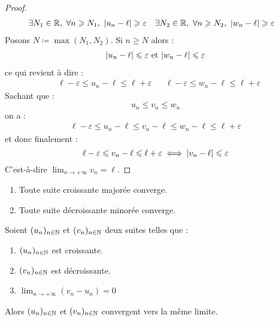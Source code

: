 \begin{proof}
    \begin{align*}
        &\exists N_1 \in \mathbb{R},\ \forall n \geqslant N_1,\ \abs{u_n - \ell} \geqslant \varepsilon &
        &\exists N_2 \in \mathbb{R},\ \forall n \geqslant N_2,\ \abs{w_n - \ell} \geqslant \varepsilon
    \end{align*}
    Posons $N \coloneqq \max(N_1, N_2)$. Si $n \geq N$ alors :
    \begin{align*}
        \abs{u_n - \ell} \leqslant \varepsilon \text{ et } \abs{w_n - \ell} \leqslant \varepsilon
    \end{align*}
    ce qui revient à dire : 
    \begin{align*}
        &\ell - \varepsilon \leq u_n - \ell \leq \ell + \varepsilon & &\ell - \varepsilon \leq w_n - \ell \leq \ell + \varepsilon
    \end{align*}
    Sachant que :
    \[ u_n \leq v_n \leq w_n \]
    on a :
    \begin{align*}
        \ell - \varepsilon \leq u_n - \ell \leq v_n - \ell \leq w_n - \ell \leq \ell + \varepsilon
    \end{align*}
    et donc finalement :
    \[ \ell - \varepsilon \leqslant v_n - \ell \leqslant \ell + \varepsilon \iff \abs{v_n - \ell} \leqslant \varepsilon \]
    C'est-à-dire $\lim_{n \to +\infty} v_n = \ell$.
\end{proof}

\begin{theorem}
    \begin{enumerate}
        \item Toute suite croissante majorée converge.
        \item Toute suite décroissante minorée converge.
    \end{enumerate}
\end{theorem}

\begin{theorem}
    Soient $(u_n)_{n \in \mathbb{N}}$ et $(v_n)_{n \in \mathbb{N}}$ deux suites telles que :
    \begin{enumerate}
            \item $(u_n)_{n \in \mathbb{N}}$ est croissante.
            \item $(v_n)_{n \in \mathbb{N}}$ est décroissante.
            \item $\lim_{n \to +\infty} (v_n - u_n) = 0$
        \end{enumerate}
    \noindent Alors $(u_n)_{n \in \mathbb{N}}$ et $(v_n)_{n \in \mathbb{N}}$ convergent vers la même limite.
\end{theorem}

